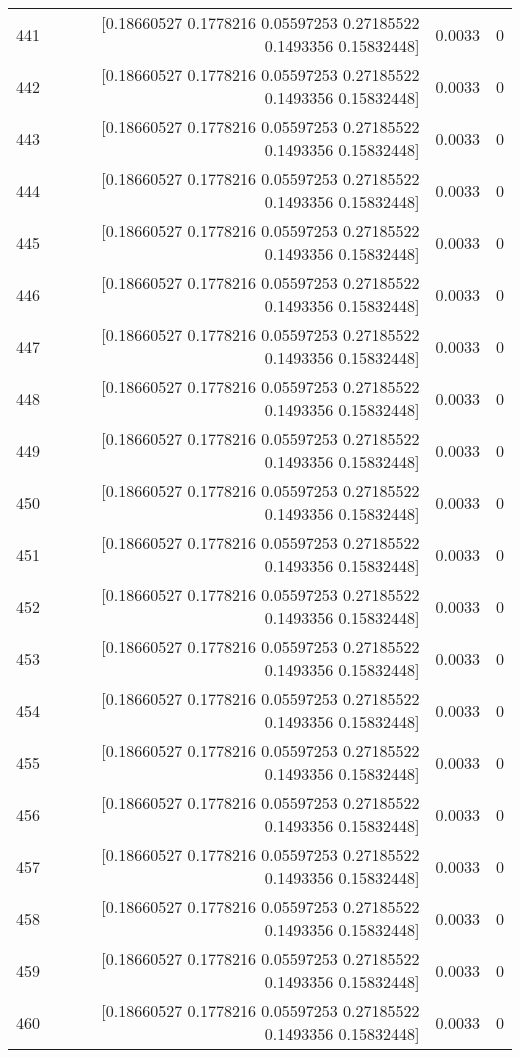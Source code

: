 \begin{longtable}{lrrr}
441 & [0.18660527 0.1778216  0.05597253 0.27185522 0.1493356  0.15832448] & 0.0033 & 0 \\
442 & [0.18660527 0.1778216  0.05597253 0.27185522 0.1493356  0.15832448] & 0.0033 & 0 \\
443 & [0.18660527 0.1778216  0.05597253 0.27185522 0.1493356  0.15832448] & 0.0033 & 0 \\
444 & [0.18660527 0.1778216  0.05597253 0.27185522 0.1493356  0.15832448] & 0.0033 & 0 \\
445 & [0.18660527 0.1778216  0.05597253 0.27185522 0.1493356  0.15832448] & 0.0033 & 0 \\
446 & [0.18660527 0.1778216  0.05597253 0.27185522 0.1493356  0.15832448] & 0.0033 & 0 \\
447 & [0.18660527 0.1778216  0.05597253 0.27185522 0.1493356  0.15832448] & 0.0033 & 0 \\
448 & [0.18660527 0.1778216  0.05597253 0.27185522 0.1493356  0.15832448] & 0.0033 & 0 \\
449 & [0.18660527 0.1778216  0.05597253 0.27185522 0.1493356  0.15832448] & 0.0033 & 0 \\
450 & [0.18660527 0.1778216  0.05597253 0.27185522 0.1493356  0.15832448] & 0.0033 & 0 \\
451 & [0.18660527 0.1778216  0.05597253 0.27185522 0.1493356  0.15832448] & 0.0033 & 0 \\
452 & [0.18660527 0.1778216  0.05597253 0.27185522 0.1493356  0.15832448] & 0.0033 & 0 \\
453 & [0.18660527 0.1778216  0.05597253 0.27185522 0.1493356  0.15832448] & 0.0033 & 0 \\
454 & [0.18660527 0.1778216  0.05597253 0.27185522 0.1493356  0.15832448] & 0.0033 & 0 \\
455 & [0.18660527 0.1778216  0.05597253 0.27185522 0.1493356  0.15832448] & 0.0033 & 0 \\
456 & [0.18660527 0.1778216  0.05597253 0.27185522 0.1493356  0.15832448] & 0.0033 & 0 \\
457 & [0.18660527 0.1778216  0.05597253 0.27185522 0.1493356  0.15832448] & 0.0033 & 0 \\
458 & [0.18660527 0.1778216  0.05597253 0.27185522 0.1493356  0.15832448] & 0.0033 & 0 \\
459 & [0.18660527 0.1778216  0.05597253 0.27185522 0.1493356  0.15832448] & 0.0033 & 0 \\
460 & [0.18660527 0.1778216  0.05597253 0.27185522 0.1493356  0.15832448] & 0.0033 & 0 \\

\end{longtable}
